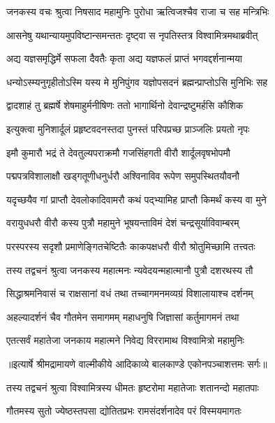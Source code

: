\twolineshloka
{जनकस्य वचः श्रुत्वा निषसाद महामुनिः}
{पुरोधा ऋत्विजश्चैव राजा च सह मन्त्रिभिः} %

\twolineshloka
{आसनेषु यथान्यायमुपविष्टान्समन्ततः}
{दृष्ट्वा स नृपतिस्तत्र विश्वामित्रमथाब्रवीत्} %

\twolineshloka
{अद्य यज्ञसमृद्धिर्मे सफला दैवतैः कृता}
{अद्य यज्ञफलं प्राप्तं भगवद्दर्शनान्मया} %

\twolineshloka
{धन्योऽस्म्यनुगृहीतोऽस्मि यस्य मे मुनिपुंगव}
{यज्ञोपसदनं ब्रह्मन्प्राप्तोऽसि मुनिभिः सह} %

\twolineshloka
{द्वादशाहं तु ब्रह्मर्षे शेषमाहुर्मनीषिणः}
{ततो भागार्थिनो देवान्द्रष्टुमर्हसि कौशिक} %

\twolineshloka
{इत्युक्त्वा मुनिशार्दूलं प्रहृष्टवदनस्तदा}
{पुनस्तं परिपप्रच्छ प्राञ्जलिः प्रयतो नृपः} %

\twolineshloka
{इमौ कुमारौ भद्रं ते देवतुल्यपराक्रमौ}
{गजसिंहगती वीरौ शार्दूलवृषभोपमौ} %

\twolineshloka
{पद्मपत्रविशालाक्षौ खड्गतूणीधनुर्धरौ}
{अश्विनाविव रूपेण समुपस्थितयौवनौ} %

\twolineshloka
{यदृच्छयैव गां प्राप्तौ देवलोकादिवामरौ}
{कथं पद्भ्यामिह प्राप्तौ किमर्थं कस्य वा मुने} %

\twolineshloka
{वरायुधधरौ वीरौ कस्य पुत्रौ महामुने}
{भूषयन्ताविमं देशं चन्द्रसूर्याविवाम्बरम्} %

\twolineshloka
{परस्परस्य सदृशौ प्रमाणेङ्गितचेष्टितैः}
{काकपक्षधरौ वीरौ श्रोतुमिच्छामि तत्त्वतः} %

\twolineshloka
{तस्य तद्वचनं श्रुत्वा जनकस्य महात्मनः}
{न्यवेदयन्महात्मानौ पुत्रौ दशरथस्य तौ} %

\twolineshloka
{सिद्धाश्रमनिवासं च राक्षसानां वधं तथा}
{तच्चागमनमव्यग्रं विशालायाश्च दर्शनम्} %

\twolineshloka
{अहल्यादर्शनं चैव गौतमेन समागमम्}
{महाधनुषि जिज्ञासां कर्तुमागमनं तथा} %

\twolineshloka
{एतत्सर्वं महातेजा जनकाय महात्मने}
{निवेद्य विररामाथ विश्वामित्रो महामुनिः} %


{॥इत्यार्षे श्रीमद्रामायणे वाल्मीकीये आदिकाव्ये बालकाण्डे एकोनपञ्चाशत्तमः सर्गः॥}


\twolineshloka
{तस्य तद्वचनं श्रुत्वा विश्वामित्रस्य धीमतः}
{हृष्टरोमा महातेजाः शतानन्दो महातपाः} %

\twolineshloka
{गौतमस्य सुतो ज्येष्ठस्तपसा द्योतितप्रभः}
{रामसंदर्शनादेव परं विस्मयमागतः} %

